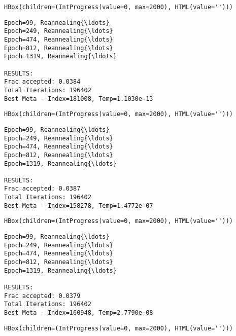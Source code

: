 \documentclass[11pt]{article}
\begin{document}
    
    \begin{verbatim}
HBox(children=(IntProgress(value=0, max=2000), HTML(value='')))
    \end{verbatim}

    
    \begin{Verbatim}[commandchars=\\\{\}]
Epoch=99, Reannealing{\ldots}
Epoch=249, Reannealing{\ldots}
Epoch=474, Reannealing{\ldots}
Epoch=812, Reannealing{\ldots}
Epoch=1319, Reannealing{\ldots}

RESULTS:
Frac accepted: 0.0384
Total Iterations: 196402
Best Meta - Index=181008, Temp=1.1030e-13

    \end{Verbatim}

    
    \begin{verbatim}
HBox(children=(IntProgress(value=0, max=2000), HTML(value='')))
    \end{verbatim}

    
    \begin{Verbatim}[commandchars=\\\{\}]
Epoch=99, Reannealing{\ldots}
Epoch=249, Reannealing{\ldots}
Epoch=474, Reannealing{\ldots}
Epoch=812, Reannealing{\ldots}
Epoch=1319, Reannealing{\ldots}

RESULTS:
Frac accepted: 0.0387
Total Iterations: 196402
Best Meta - Index=158278, Temp=1.4772e-07

    \end{Verbatim}

    
    \begin{verbatim}
HBox(children=(IntProgress(value=0, max=2000), HTML(value='')))
    \end{verbatim}

    
    \begin{Verbatim}[commandchars=\\\{\}]
Epoch=99, Reannealing{\ldots}
Epoch=249, Reannealing{\ldots}
Epoch=474, Reannealing{\ldots}
Epoch=812, Reannealing{\ldots}
Epoch=1319, Reannealing{\ldots}

RESULTS:
Frac accepted: 0.0379
Total Iterations: 196402
Best Meta - Index=160948, Temp=2.7790e-08

    \end{Verbatim}

    
    \begin{verbatim}
HBox(children=(IntProgress(value=0, max=2000), HTML(value='')))
    \end{verbatim}
\end{document}
